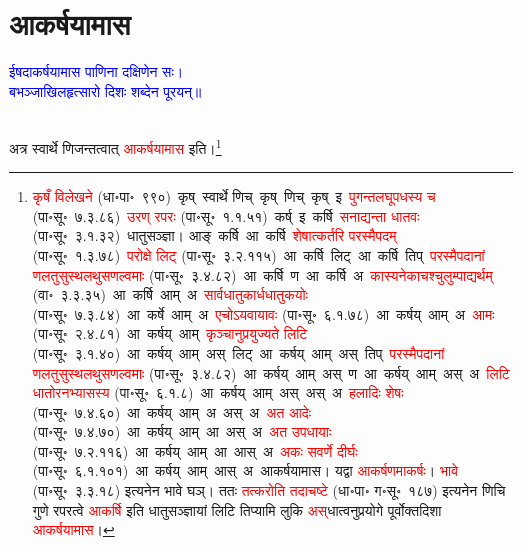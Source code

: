 \section[आकर्षयामास]{आकर्षयामास}
\centering\textcolor{blue}{ईषदाकर्षयामास पाणिना दक्षिणेन सः।\nopagebreak\\
बभञ्जाखिलहृत्सारो दिशः शब्देन पूरयन्॥}\nopagebreak\\
\\
\fontsize{14}{21}\selectfont\begin{sloppypar}\justifying\noindent\hspace{10mm} अत्र स्वार्थे णिजन्तत्वात् \textcolor{red}{आकर्षयामास} इति।\footnote{\textcolor{red}{कृषँ विलेखने} (धा॰पा॰~९९०)~\arrow कृष्~\arrow स्वार्थे णिच्~\arrow कृष्~णिच्~\arrow कृष्~इ~\arrow \textcolor{red}{पुगन्त\-लघूपधस्य च} (पा॰सू॰~७.३.८६)~\arrow \textcolor{red}{उरण् रपरः} (पा॰सू॰~१.१.५१)~\arrow कर्ष्~इ~\arrow कर्षि~\arrow \textcolor{red}{सनाद्यन्ता धातवः} (पा॰सू॰~३.१.३२)~\arrow धातुसञ्ज्ञा। आङ्~कर्षि~\arrow आ~कर्षि~\arrow \textcolor{red}{शेषात्कर्तरि परस्मैपदम्} (पा॰सू॰~१.३.७८)~\arrow \textcolor{red}{परोक्षे लिट्} (पा॰सू॰~३.२.११५)~\arrow आ~कर्षि~लिट्~\arrow आ~कर्षि~तिप्~\arrow \textcolor{red}{परस्मैपदानां णलतुसुस्थलथुस\-णल्वमाः} (पा॰सू॰~३.४.८२)~\arrow आ~कर्षि~ण~\arrow आ~कर्षि~अ~\arrow \textcolor{red}{कास्यनेकाचश्चुलुम्पाद्यर्थम्} (वा॰~३.३.३५)~\arrow आ~कर्षि~आम्~अ~\arrow \textcolor{red}{सार्वधातुकार्धधातुकयोः} (पा॰सू॰~७.३.८४)~\arrow आ~कर्षे~आम्~अ~\arrow \textcolor{red}{एचोऽयवायावः} (पा॰सू॰~६.१.७८)~\arrow आ~कर्षय्~आम्~अ~\arrow \textcolor{red}{आमः} (पा॰सू॰~२.४.८१)~\arrow आ~कर्षय्~आम्~\arrow \textcolor{red}{कृञ्चानुप्रयुज्यते लिटि} (पा॰सू॰~३.१.४०)~\arrow आ~कर्षय्~आम्~अस्~लिट्~\arrow आ~कर्षय्~आम्~अस्~तिप्~\arrow \textcolor{red}{परस्मैपदानां णलतुसुस्थलथुस\-णल्वमाः} (पा॰सू॰~३.४.८२)~\arrow आ~कर्षय्~आम्~अस्~ण~\arrow आ~कर्षय्~आम्~अस्~अ~\arrow \textcolor{red}{लिटि धातोरनभ्यासस्य} (पा॰सू॰~६.१.८)~\arrow आ~कर्षय्~आम्~अस्~अस्~अ~\arrow \textcolor{red}{हलादिः शेषः} (पा॰सू॰~७.४.६०)~\arrow आ~कर्षय्~आम्~अ~अस्~अ~\arrow \textcolor{red}{अत आदेः} (पा॰सू॰~७.४.७०)~\arrow आ~कर्षय्~आम्~आ~अस्~अ~\arrow \textcolor{red}{अत उपधायाः} (पा॰सू॰~७.२.११६)~\arrow आ~कर्षय्~आम्~आ~आस्~अ~\arrow \textcolor{red}{अकः सवर्णे दीर्घः} (पा॰सू॰~६.१.१०१)~\arrow आ~कर्षय्~आम्~आस्~अ~\arrow आकर्षयामास। यद्वा \textcolor{red}{आकर्षणमाकर्षः}। \textcolor{red}{भावे} (पा॰सू॰~३.३.१८) इत्यनेन भावे घञ्। ततः \textcolor{red}{तत्करोति तदाचष्टे} (धा॰पा॰ ग॰सू॰~१८७) इत्यनेन णिचि गुणे रपरत्वे \textcolor{red}{आकर्षि} इति धातुसञ्ज्ञायां लिटि तिप्यामि लुकि \textcolor{red}{अस्‌}\-धात्वनु\-प्रयोगे पूर्वोक्तदिशा \textcolor{red}{आकर्षयामास}।}\end{sloppypar}
